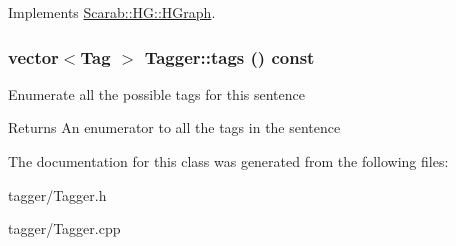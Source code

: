 Implements \hyperlink{classScarab_1_1HG_1_1HGraph_ab5aa11c932b28864b56f28e0babbc1c1}{Scarab::HG::HGraph}.

\hypertarget{classTagger_ae1e3802fb545c3430ca4d52ea5fd95db}{
\subsubsection[{tags}]{\setlength{\rightskip}{0pt plus 5cm}vector$<${\bf Tag} $>$ Tagger::tags () const}}
\label{classTagger_ae1e3802fb545c3430ca4d52ea5fd95db}
Enumerate all the possible tags for this sentence

\begin{DoxyReturn}{Returns}
An enumerator to all the tags in the sentence 
\end{DoxyReturn}


The documentation for this class was generated from the following files:\begin{DoxyCompactItemize}
\item 
tagger/Tagger.h\item 
tagger/Tagger.cpp\end{DoxyCompactItemize}

